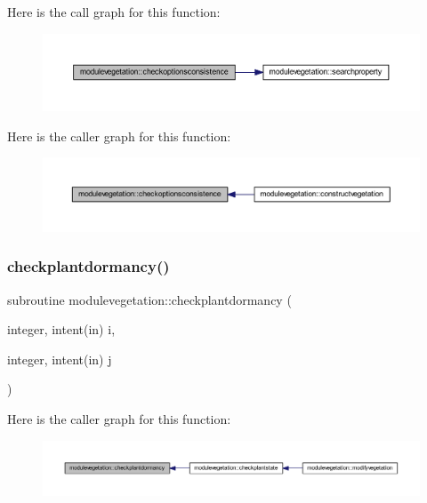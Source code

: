 Here is the call graph for this function\+:\nopagebreak
\begin{figure}[H]
\begin{center}
\leavevmode
\includegraphics[width=350pt]{namespacemodulevegetation_a0b1feb4dec9ae87423940f66f7c66f76_cgraph}
\end{center}
\end{figure}
Here is the caller graph for this function\+:\nopagebreak
\begin{figure}[H]
\begin{center}
\leavevmode
\includegraphics[width=350pt]{namespacemodulevegetation_a0b1feb4dec9ae87423940f66f7c66f76_icgraph}
\end{center}
\end{figure}
\mbox{\label{namespacemodulevegetation_ad6c8bd7bf7ef1c60a031f3752ea5d26d}} 
\subsubsection{\texorpdfstring{checkplantdormancy()}{checkplantdormancy()}}
{\footnotesize\ttfamily subroutine modulevegetation\+::checkplantdormancy (\begin{DoxyParamCaption}\item[{integer, intent(in)}]{i,  }\item[{integer, intent(in)}]{j }\end{DoxyParamCaption})\hspace{0.3cm}{\ttfamily [private]}}

Here is the caller graph for this function\+:\nopagebreak
\begin{figure}[H]
\begin{center}
\leavevmode
\includegraphics[width=350pt]{namespacemodulevegetation_ad6c8bd7bf7ef1c60a031f3752ea5d26d_icgraph}
\end{center}
\end{figure}
\mbox{\label{namespacemodulevegetation_afa2f07d94b35869067e9a8e4533df2fa}} 
